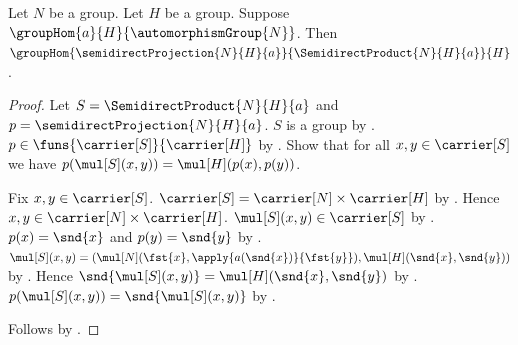 \begin{theorem}\label{semidirect_projection_hom}
    Let $N$ be a group.
    Let $H$ be a group.
    Suppose $\groupHom{a}{H}{\automorphismGroup{N}}$.
    Then
        $\groupHom{\semidirectProjection{N}{H}{a}}
            {\SemidirectProduct{N}{H}{a}}{H}$.
\end{theorem}
\begin{proof}
    Let $S=\SemidirectProduct{N}{H}{a}$ and
        $p=\semidirectProjection{N}{H}{a}$.
    $S$ is a group by .
    $p\in\funs{\carrier[S]}{\carrier[H]}$ by
        .
    Show that for all $x,y\in\carrier[S]$ we have
        $p(\mul[S](x,y))=\mul[H](p(x),p(y))$.
    \begin{subproof}
        Fix $x,y\in\carrier[S]$.
        $\carrier[S]=\carrier[N]\times\carrier[H]$ by
            .
        Hence $x,y\in\carrier[N]\times\carrier[H]$.
        $\mul[S](x,y)\in\carrier[S]$ by
            .
        $p(x)=\snd{x}$ and $p(y)=\snd{y}$ by
            .
        $\mul[S](x,y)=
            (\mul[N](\fst{x},\apply{a(\snd{x})}{\fst{y}}),
             \mul[H](\snd{x},\snd{y}))$ by
            .
        Hence $\snd{\mul[S](x,y)}=\mul[H](\snd{x},\snd{y})$ by
            .
        $p(\mul[S](x,y))=\snd{\mul[S](x,y)}$ by
            .
    \end{subproof}
    Follows by .
\end{proof}

